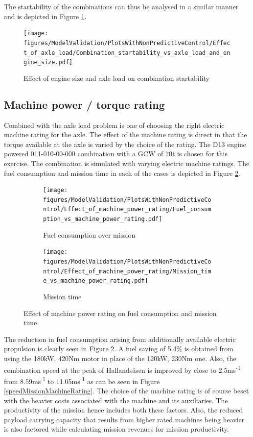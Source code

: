 \documentclass[ExampleMasters.tex]{subfiles}
\begin{document}
The startability of the combinations can thus be analysed in a similar manner and is depicted in Figure \ref{startabilityEngineAxleLoad}.\\

\begin{figure}[h!]
\centering
\texttt{[image: figures/ModelValidation/PlotsWithNonPredictiveControl/Effect\_of\_axle\_load/Combination\_startability\_vs\_axle\_load\_and\_engine\_size.pdf]}
\caption{Effect of engine size and axle load on combination startability}
\label{startabilityEngineAxleLoad}
\end{figure}

\subsection{Machine power / torque rating}

Combined with the axle load problem is one of choosing the right electric machine rating for the axle. The effect of the machine rating is direct in that the torque available at the axle is varied by the choice of the rating. The D13 engine powered 011-010-00-000 combination with a GCW of 70t is chosen for this exercise. The combination is simulated with varying electric machine ratings. The fuel consumption and mission time in each of the cases is depicted in Figure \ref{fuelTimeEngineAxleLoad}.\\

\begin{figure}[h!]
\begin{subfigure}{.5\textwidth}
	\centering
	\texttt{[image: figures/ModelValidation/PlotsWithNonPredictiveControl/Effect\_of\_machine\_power\_rating/Fuel\_consumption\_vs\_machine\_power\_rating.pdf]}
	\caption{Fuel consumption over mission}
\end{subfigure}
\begin{subfigure}{.5\textwidth}
	\centering
	\texttt{[image: figures/ModelValidation/PlotsWithNonPredictiveControl/Effect\_of\_machine\_power\_rating/Mission\_time\_vs\_machine\_power\_rating.pdf]}
	\caption{Mission time}
\end{subfigure}
\caption{Effect of machine power rating on fuel consumption and mission time}
\label{fuelTimeEngineAxleLoad}
\end{figure}

The reduction in fuel consumption arising from additionally available electric propulsion is clearly seen in Figure \ref{fuelTimeEngineAxleLoad}. A fuel saving of 5.4\% is obtained from using the 180kW, 420Nm motor in place of the 120kW, 230Nm one. Also, the combination speed at the peak of Hallands\aa sen is improved by close to 2.5ms\textsuperscript{-1} from 8.59ms\textsuperscript{-1} to 11.05ms\textsuperscript{-1} as can be seen in Figure \ref{speedMissionMachineRating}. The choice of the machine rating is of course beset with the heavier costs associated with the machine and its auxiliaries. The productivity of the mission hence includes both these factors. Also, the reduced payload carrying capacity that results from higher rated machines being heavier is also factored while calculating mission revenues for mission productivity.\\
\end{document}
